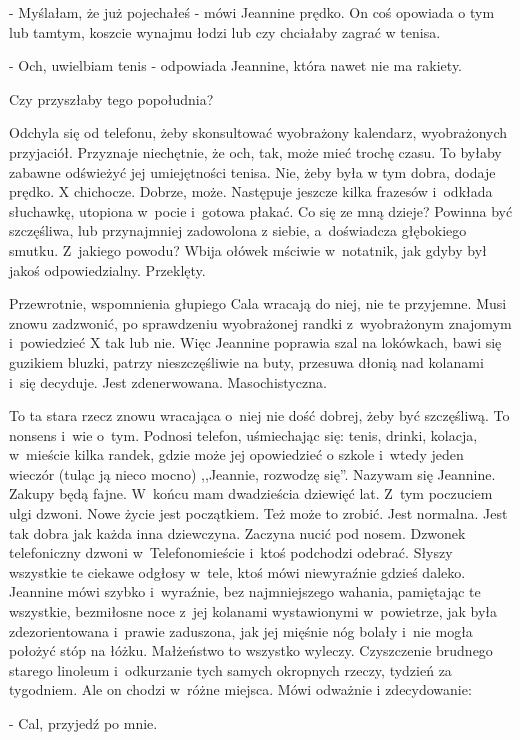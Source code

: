 \documentclass[oneside,polish,12pt,sfheadings]{mwbk}
\begin{document}
- Myślałam, że już pojechałeś - mówi Jeannine prędko. On coś opowiada
o tym lub tamtym, koszcie wynajmu łodzi lub czy chciałaby zagrać w
tenisa.

- Och, uwielbiam tenis - odpowiada Jeannine, która nawet nie ma rakiety.

Czy przyszłaby tego popołudnia?

Odchyla się od telefonu, żeby skonsultować wyobrażony kalendarz, wyobrażonych
przyjaciół. Przyznaje niechętnie, że och, tak, może mieć trochę czasu.
To byłaby zabawne odświeżyć jej umiejętności tenisa. Nie, żeby była
w tym dobra, dodaje prędko. X chichocze. Dobrze, może. Następuje jeszcze
kilka frazesów i~odkłada słuchawkę, utopiona w~pocie i~gotowa płakać.
Co się ze mną dzieje? Powinna być szczęśliwa, lub przynajmniej zadowolona
z siebie, a~doświadcza głębokiego smutku. Z~jakiego powodu? Wbija
ołówek mściwie w~notatnik, jak gdyby był jakoś odpowiedzialny. Przeklęty.

Przewrotnie, wspomnienia głupiego Cala wracają do niej, nie te przyjemne.
Musi znowu zadzwonić, po sprawdzeniu wyobrażonej randki z~wyobrażonym
znajomym i~powiedzieć X tak lub nie. Więc Jeannine poprawia szal na
lokówkach, bawi się guzikiem bluzki, patrzy nieszczęśliwie na buty,
przesuwa dłonią nad kolanami i~się decyduje. Jest zdenerwowana. Masochistyczna.

To ta stara rzecz znowu wracająca o~niej nie dość dobrej, żeby być
szczęśliwą. To nonsens i~wie o~tym. Podnosi telefon, uśmiechając się:
tenis, drinki, kolacja, w~mieście kilka randek, gdzie może jej opowiedzieć
o szkole i~wtedy jeden wieczór (tuląc ją nieco mocno) ,,Jeannie, rozwodzę się''. Nazywam się Jeannine. Zakupy będą fajne. W~końcu mam dwadzieścia dziewięć lat. Z~tym poczuciem ulgi dzwoni. Nowe życie
jest początkiem. Też może to zrobić. Jest normalna. Jest tak dobra
jak każda inna dziewczyna. Zaczyna nucić pod nosem. Dzwonek telefoniczny
dzwoni w~Telefonomieście i~ktoś podchodzi odebrać. Słyszy wszystkie
te ciekawe odgłosy w~tele, ktoś mówi niewyraźnie gdzieś daleko. Jeannine
mówi szybko i~wyraźnie, bez najmniejszego wahania, pamiętając te wszystkie,
bezmiłosne noce z~jej kolanami wystawionymi w~powietrze, jak była
zdezorientowana i~prawie zaduszona, jak jej mięśnie nóg bolały i~nie
mogła położyć stóp na łóżku. Małżeństwo to wszystko wyleczy. Czyszczenie
brudnego starego linoleum i~odkurzanie tych samych okropnych rzeczy,
tydzień za tygodniem. Ale on chodzi w~różne miejsca. Mówi odważnie
i zdecydowanie: 

- Cal, przyjedź po mnie.
\end{document}
